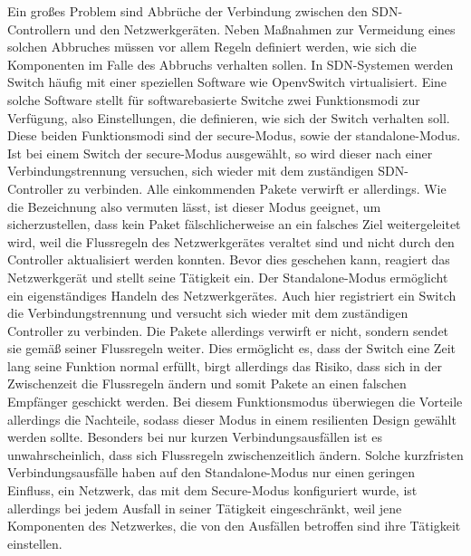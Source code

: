 Ein großes Problem sind Abbrüche der Verbindung zwischen den SDN-Controllern und den Netzwerkgeräten. Neben Maßnahmen zur Vermeidung eines solchen Abbruches müssen vor allem Regeln definiert werden, 
wie sich die Komponenten im Falle des Abbruchs verhalten sollen. In SDN-Systemen werden Switch häufig mit einer speziellen Software wie OpenvSwitch virtualisiert. 
Eine solche Software stellt für softwarebasierte Switche zwei Funktionsmodi zur Verfügung, also Einstellungen, die definieren, wie sich der Switch verhalten soll. Diese beiden Funktionsmodi sind der secure-Modus, 
sowie der standalone-Modus. Ist bei einem Switch der secure-Modus ausgewählt, so wird dieser nach einer Verbindungstrennung versuchen, sich wieder mit dem zuständigen SDN-Controller zu verbinden. 
Alle einkommenden Pakete verwirft er allerdings. Wie die Bezeichnung also vermuten lässt, ist dieser Modus geeignet, um sicherzustellen, dass kein Paket fälschlicherweise an ein falsches Ziel weitergeleitet wird, 
weil die Flussregeln des Netzwerkgerätes veraltet sind und nicht durch den Controller aktualisiert werden konnten. Bevor dies geschehen kann, reagiert das Netzwerkgerät und stellt seine Tätigkeit ein. 
Der Standalone-Modus ermöglicht ein eigenständiges Handeln des Netzwerkgerätes. Auch hier registriert ein Switch die Verbindungstrennung und versucht sich wieder mit dem zuständigen Controller zu verbinden. 
Die Pakete allerdings verwirft er nicht, sondern sendet sie gemäß seiner Flussregeln weiter. Dies ermöglicht es, dass der Switch eine Zeit lang seine Funktion normal erfüllt, birgt allerdings das Risiko, 
dass sich in der Zwischenzeit die Flussregeln ändern und somit Pakete an einen falschen Empfänger geschickt werden.
Bei diesem Funktionsmodus überwiegen die Vorteile allerdings die Nachteile, sodass dieser Modus in einem resilienten Design gewählt werden sollte. Besonders bei nur kurzen Verbindungsausfällen ist es unwahrscheinlich, 
dass sich Flussregeln zwischenzeitlich ändern. Solche kurzfristen Verbindungsausfälle haben auf den Standalone-Modus nur einen geringen Einfluss, ein Netzwerk, das mit dem Secure-Modus konfiguriert wurde, 
ist allerdings bei jedem Ausfall in seiner Tätigkeit eingeschränkt, weil jene Komponenten des Netzwerkes, die von den Ausfällen betroffen sind ihre Tätigkeit einstellen.


